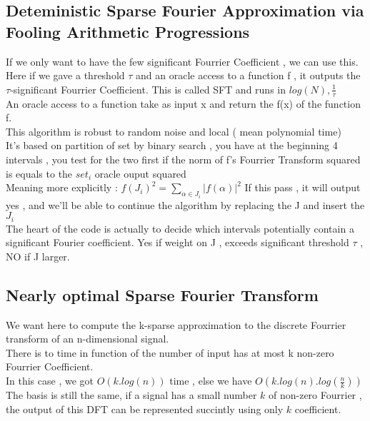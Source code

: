 \documentclass{article}
\begin{document}
\subsection{Deteministic Sparse Fourier Approximation via Fooling Arithmetic Progressions}
If we only want to have the few significant Fourrier Coefficient , we can use this.\\
Here if we gave a threshold $\tau$ and an oracle access to a function f , it outputs the $\tau$-significant Fourrier Coefficient. This is called SFT and runs in $log(N) ,\frac{1}{\tau}$\\
An oracle access to a function take as input x and return the f(x) of the function f.\\
This algorithm is robust to random noise and local ( mean polynomial time)\\
It's based on partition of set by binary search , you have at the beginning 4 intervals , you test for the two first if the norm of f's Fourrier Transform squared is equals to the $set_i$ oracle ouput squared\\
Meaning more explicitly : $f(J_i)^2 = \sum_{\alpha \in J_i}{|f(\alpha)|^2}$ If this pass , it will output yes , and we'll be able to continue the algorithm by replacing the J and insert the $J_i$\\
The heart of the code is actually to decide which intervals potentially contain a significant Fourier coefficient. Yes if weight on J , exceeds significant threshold $\tau$ , NO if J larger.
\subsection{Nearly optimal Sparse Fourier Transform}
We want here to compute the k-sparse approximation to the discrete Fourrier transform of an n-dimensional signal.\\
There is to time in function of the number of input has at most k non-zero Fourrier Coefficient.\\
In this case , we got $O(k.log(n))$ time , else we have $O(k.log(n).log(\frac{n}{k}))$\\
The basis is still the same, if a signal has a small number $k$ of non-zero Fourrier , the output of this DFT can be represented succintly using only $k$ coefficient.\\
\end{document}
